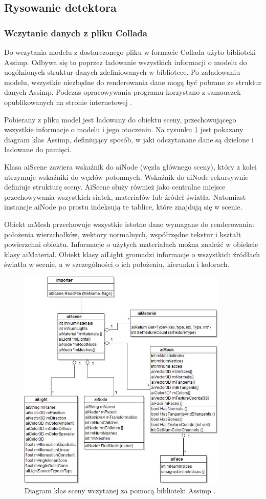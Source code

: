\subsection{Rysowanie detektora}
\subsubsection{Wczytanie danych z pliku Collada}
Do wczytania modelu z dostarczonego pliku w formacie Collada użyto biblioteki Assimp. Odbywa się to poprzez ładowanie wszystkich informacji o modelu do uogólnionych struktur danych zdefiniowanych w bibliotece. Po załadowaniu modelu, wszystkie niezbędne do renderowania dane mogą być pobrane ze struktur danych Assimp. Podczas opracowywania programu korzystano z samouczek opublikowanych na stronie internetowej \cite{learnopengl}. 

Pobierany z pliku model jest ładowany do obiektu sceny, przechowującego wszystkie informacje o modelu i jego otoczeniu. Na rysunku \ref{rys14} jest pokazany diagram klas Assimp, definiujący sposób, w jaki odczytanane dane są dzielone i ładowane do pamięci.

Klasa aiScene zawiera wskaźnik do aiNode (węzła głównego sceny), który z kolei utrzymuje wskaźniki do węzłów potomnych. Wskaźnik do aiNode rekursywnie definiuje strukturę sceny. AiScene służy również jako centralne miejsce przechowywania wszystkich siatek, materiałów lub źródeł światła. Natomiast instancje aiNode po prostu indeksują te tablice, które znajdują się w scenie.

Obiekt mMesh przechowuje wszystkie istotne dane wymagane do renderowania: położenia wierzchołków, wektory normalnych, współrzędne tekstur i kształt powierzchni obiektu. Informacje o użytych materiałach można znaleźć w obiekcie klasy aiMaterial. Obiekt klasy aiLight gromadzi informacje o wszystkich źródłach światła w scenie, a w szczególności o ich położeniu, kierunku i kolorach. 

\begin{figure}[H]
		\centering
 		\includegraphics[width=10.0cm]{assimpClasses.png}
    	\caption{Diagram klas sceny wczytanej za pomocą biblioteki Assimp \cite{assimpImport}.}
 		\label{rys14}
\end{figure}

